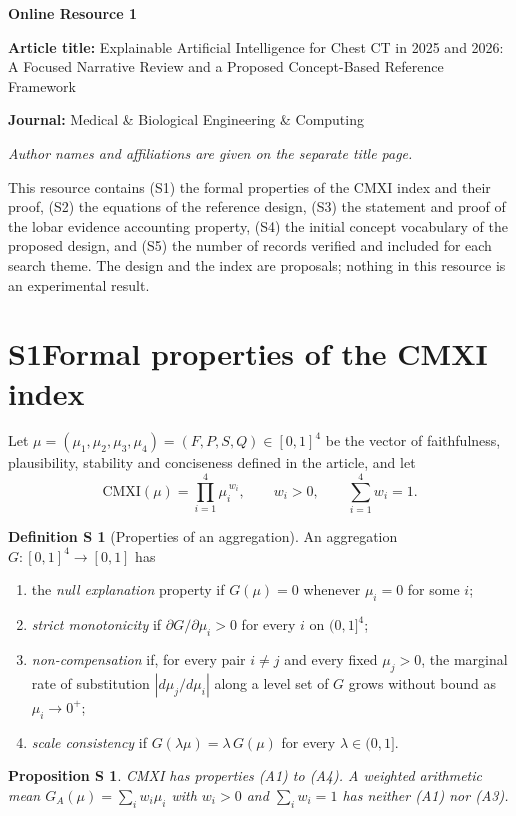 \documentclass[10pt,a4paper]{article}
\newtheorem{proposition}{Proposition S\!}
\theoremstyle{definition}\newtheorem{definition}{Definition S\!}
\theoremstyle{remark}\newtheorem{remark}{Remark S\!}
\begin{document}
{\large\bfseries Online Resource 1}

\textbf{Article title:} Explainable Artificial Intelligence for Chest CT in 2025 and 2026: A Focused Narrative Review and a Proposed Concept-Based Reference Framework

\textbf{Journal:} Medical \& Biological Engineering \& Computing

\textit{Author names and affiliations are given on the separate title page.}

This resource contains (S1) the formal properties of the CMXI index and their proof, (S2) the equations of the reference design, (S3) the statement and proof of the lobar evidence accounting property, (S4) the initial concept vocabulary of the proposed design, and (S5) the number of records verified and included for each search theme. The design and the index are proposals; nothing in this resource is an experimental result.

\section*{S1\quad Formal properties of the CMXI index}

Let $\mu=(\mu_1,\mu_2,\mu_3,\mu_4)=(F,P,S,Q)\in[0,1]^4$ be the vector of faithfulness, plausibility, stability and conciseness defined in the article, and let
\[
\mathrm{CMXI}(\mu)=\prod_{i=1}^{4}\mu_i^{\,w_i},\qquad w_i>0,\qquad \sum_{i=1}^{4}w_i=1 .
\]

\begin{definition}[Properties of an aggregation]
An aggregation $G:[0,1]^4\to[0,1]$ has
\begin{enumerate}[label=(A\arabic*),leftmargin=12mm,itemsep=1pt,topsep=2pt]
\item the \emph{null explanation} property if $G(\mu)=0$ whenever $\mu_i=0$ for some $i$;
\item \emph{strict monotonicity} if $\partial G/\partial\mu_i>0$ for every $i$ on $(0,1]^4$;
\item \emph{non-compensation} if, for every pair $i\neq j$ and every fixed $\mu_j>0$, the marginal rate of substitution $|d\mu_j/d\mu_i|$ along a level set of $G$ grows without bound as $\mu_i\to 0^{+}$;
\item \emph{scale consistency} if $G(\lambda\mu)=\lambda\,G(\mu)$ for every $\lambda\in(0,1]$.
\end{enumerate}
\end{definition}

\begin{proposition}
CMXI has properties (A1) to (A4). A weighted arithmetic mean $G_A(\mu)=\sum_i w_i\mu_i$ with $w_i>0$ and $\sum_i w_i=1$ has neither (A1) nor (A3).
\end{proposition}
\end{document}
